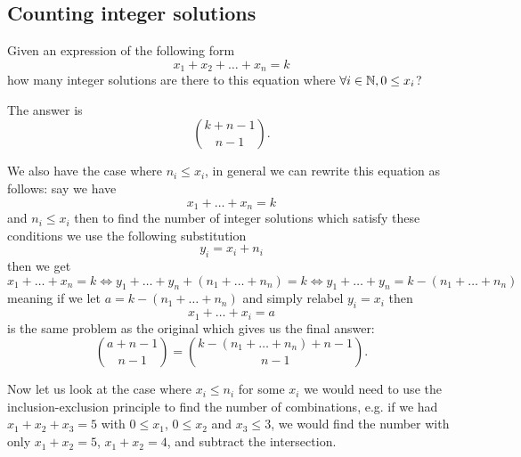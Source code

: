 \documentclass[10pt, a4paper]{article}
\begin{document}
\begin{center}
\end{center}
\hfill


\subsection{Counting integer solutions}
Given an expression of the following form
\[
x_1 + x_2 + \dotsc + x_n = k
\]
how many integer solutions are there to this equation where $\forall i \in \mathbb{N}, 0 \leq x_i$?

The answer is
\[
\binom{k + n - 1}{n - 1}.
\]

We also have the case where $n_i \leq x_i$,
in general we can rewrite this equation as follows:
say we have
\[
x_1 + \dotsc + x_n = k
\]
and $n_i \leq x_i$ then to find the number of integer solutions which satisfy these conditions we use the following substitution
\[
y_i = x_i + n_i
\]
then we get
\[
x_1 + \dotsc + x_n = k \iff y_1 + \dotsc + y_n + (n_1 + \dotsc + n_n) = k \iff y_1 + \dotsc + y_n = k - (n_1 + \dotsc + n_n)
\]
meaning if we let $a = k - (n_1 + \dotsc + n_n)$ and simply relabel $y_i = x_i$ then
\[
x_1 + \dotsc + x_i = a
\]
is the same problem as the original which gives us the final answer:
\[
\binom{a + n - 1}{n - 1} = \binom{k - (n_1 + \dotsc + n_n) + n - 1}{n - 1}.
\]

Now let us look at the case where $x_i \leq n_i$ for some $x_i$ we would need to use the inclusion-exclusion principle to find the number of combinations,
e.g.
if we had $x_1 + x_2 + x_3 = 5$ with $0 \leq x_1$,
$0 \leq x_2$ and $x_3 \leq 3$,
we would find the number with only $x_1 + x_2 = 5$,
$x_1 + x_2 = 4$,
and subtract the intersection.
\end{document}
